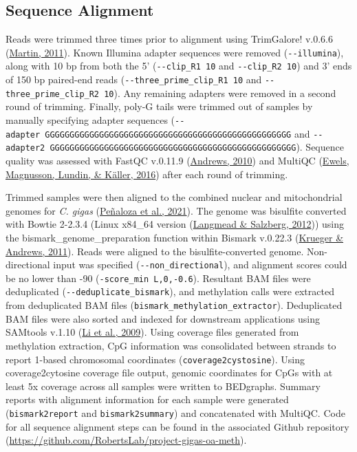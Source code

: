 \documentclass [11pt, proquest] {uwthesis}[2015/03/03]
\begin{document}
\hypertarget{sequence-alignment}{%
\subsection{Sequence Alignment}\label{sequence-alignment}}

Reads were trimmed three times prior to alignment using TrimGalore! v.0.6.6 (\protect\hyperlink{ref-Martin2011}{Martin, 2011}). Known Illumina adapter sequences were removed (\texttt{-\/-illumina}), along with 10 bp from both the 5' (\texttt{-\/-clip\_R1\ 10} and \texttt{-\/-clip\_R2\ 10}) and 3' ends of 150 bp paired-end reads (\texttt{-\/-three\_prime\_clip\_R1\ 10} and \texttt{-\/-three\_prime\_clip\_R2\ 10}). Any remaining adapters were removed in a second round of trimming. Finally, poly-G tails were trimmed out of samples by manually specifying adapter sequences (\texttt{-\/-adapter\ GGGGGGGGGGGGGGGGGGGGGGGGGGGGGGGGGGGGGGGGGGGGGGGGGG} and \texttt{-\/-adapter2\ GGGGGGGGGGGGGGGGGGGGGGGGGGGGGGGGGGGGGGGGGGGGGGGGGG}). Sequence quality was assessed with FastQC v.0.11.9 (\protect\hyperlink{ref-Andrews2010}{Andrews, 2010}) and MultiQC (\protect\hyperlink{ref-Ewels2016}{Ewels, Magnusson, Lundin, \& Käller, 2016}) after each round of trimming.

Trimmed samples were then aligned to the combined nuclear and mitochondrial genomes for \emph{C. gigas} (\protect\hyperlink{ref-Penaloza2021}{Peñaloza et al., 2021}). The genome was bisulfite converted with Bowtie 2-2.3.4 (Linux x84\_64 version (\protect\hyperlink{ref-Langmead2012}{Langmead \& Salzberg, 2012})) using the bismark\_genome\_preparation function within Bismark v.0.22.3 (\protect\hyperlink{ref-Krueger2011}{Krueger \& Andrews, 2011}). Reads were aligned to the bisulfite-converted genome. Non-directional input was specified (\texttt{-\/-non\_directional}), and alignment scores could be no lower than -90 (\texttt{-score\_min\ L,0,-0.6}). Resultant BAM files were deduplicated (\texttt{-\/-deduplicate\_bismark}), and methylation calls were extracted from deduplicated BAM files (\texttt{bismark\_methylation\_extractor}). Deduplicated BAM files were also sorted and indexed for downstream applications using SAMtools v.1.10 (\protect\hyperlink{ref-Li2009}{Li et al., 2009}). Using coverage files generated from methylation extraction, CpG information was consolidated between strands to report 1-based chromosomal coordinates (\texttt{coverage2cystosine}). Using coverage2cytosine coverage file output, genomic coordinates for CpGs with at least 5x coverage across all samples were written to BEDgraphs. Summary reports with alignment information for each sample were generated (\texttt{bismark2report} and \texttt{bismark2summary}) and concatenated with MultiQC. Code for all sequence alignment steps can be found in the associated Github repository (\url{https://github.com/RobertsLab/project-gigas-oa-meth}).
\end{document}
